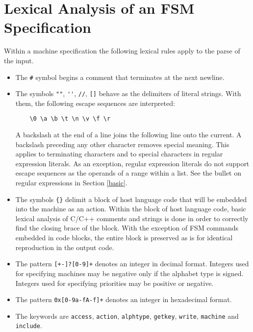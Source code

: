 \documentclass[letterpaper,11pt,oneside]{book}
\begin{document}
\section{Lexical Analysis of an FSM Specification}
\label{lexing}

Within a machine specification the following lexical rules apply to the parse
of the input.

\begin{itemize}

\item The \verb|#| symbol begins a comment that terminates at the next newline.

\item The symbols \verb|""|, \verb|''|, \verb|//|, \verb|[]| behave as the
delimiters of literal strings. With them, the following escape sequences are interpreted: 

\verb|    \0 \a \b \t \n \v \f \r|

A backslash at the end of a line joins the following line onto the current. A
backslash preceding any other character removes special meaning. This applies
to terminating characters and to special characters in regular expression
literals. As an exception, regular expression literals do not support escape
sequences as the operands of a range within a list. See the bullet on regular
expressions in Section \ref{basic}.

\item The symbols \verb|{}| delimit a block of host language code that will be
embedded into the machine as an action.  Within the block of host language
code, basic lexical analysis of C/C++ comments and strings is done in order to
correctly find the closing brace of the block. With the exception of FSM
commands embedded in code blocks, the entire block is preserved as is for
identical reproduction in the output code.

\item The pattern \verb|[+-]?[0-9]+| denotes an integer in decimal format.
Integers used for specifying machines may be negative only if the alphabet type
is signed. Integers used for specifying priorities may be positive or negative.

\item The pattern \verb|0x[0-9a-fA-f]+| denotes an integer in hexadecimal
format.

\item The keywords are \verb|access|, \verb|action|, \verb|alphtype|,
\verb|getkey|, \verb|write|, \verb|machine| and \verb|include|.


\end{itemize}
\end{document}
